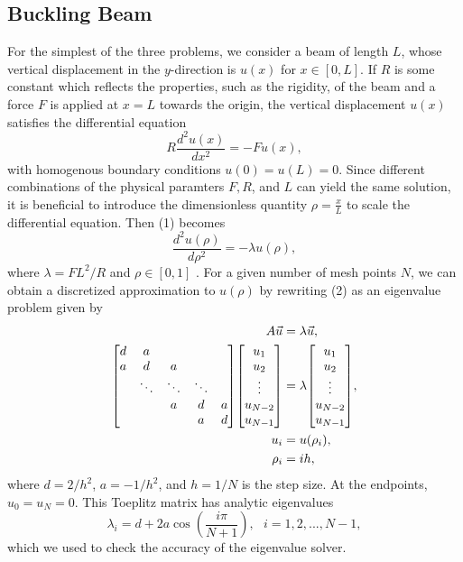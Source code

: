 \documentclass[prb,aps,twocolumn,showpacs,10pt]{revtex4-1}
\newenvironment{psmallmatrix}
  {\left[\begin{matrix}}
  {\end{matrix}\right]}
\begin{document}
\subsection{Buckling Beam}
For the simplest of the three problems, we consider a beam of length $L$, whose vertical displacement in the $y$-direction is $u(x)$ for $x \in [0,L]$. If $R$ is some constant which reflects the properties, such as the rigidity, of the beam and a force $F$ is applied at $x=L$ towards the origin, the vertical displacement $u(x)$ satisfies the differential equation
\begin{equation}
R\frac{d^2 u(x)}{dx^2} = -Fu(x),
\end{equation}
with homogenous boundary conditions $u(0)=u(L)=0$. Since different combinations of the physical paramters $F, R$, and $L$ can yield the same solution, it is beneficial to introduce the dimensionless quantity $\rho = \frac{x}{L}$ to scale the differential equation. Then (1) becomes
\begin{equation}
\frac{d^2 u(\rho)}{d\rho^2} = -\lambda u(\rho),
\end{equation}
where $\lambda = FL^2/R$ and $\rho \in [0,1]$ \cite{notes}. For a given number of mesh points $N$, we can obtain a discretized approximation to $u(\rho)$ by rewriting (2) as an eigenvalue problem given by
\begin{align}
\label{eqn:eqlabel}
\begin{split}
A\vec{u} &= \lambda \vec{u},
\\
\begin{psmallmatrix} d&a& \\
a&d&a\\
&\ddots&\ddots&\ddots\\
&&a&d&a\\
&&&a&d\\
\end{psmallmatrix}
\begin{psmallmatrix}
u_1\\u_2\\ \vdots \\ u_{N-2}\\ u_{N-1}
\end{psmallmatrix}&=
\lambda
\begin{psmallmatrix}
u_1\\u_2\\ \vdots \\ u_{N-2}\\ u_{N-1}
\end{psmallmatrix},\\
u_i &= u(\rho_i),\\
\rho_i &= ih,\\
\end{split}
\end{align}
where $d = 2/h^2$, $a = -1/h^2$, and $h = 1/N$ is the step size. At the endpoints, $u_0 = u_N = 0$. This Toeplitz matrix has analytic eigenvalues
\begin{equation}
\lambda_i = d+2a\cos \left( \frac{i \pi}{N+1} \right) , \ \ \ i = 1, 2, ..., N-1,
\end{equation}
which we used to check the accuracy of the eigenvalue solver.
\end{document}
